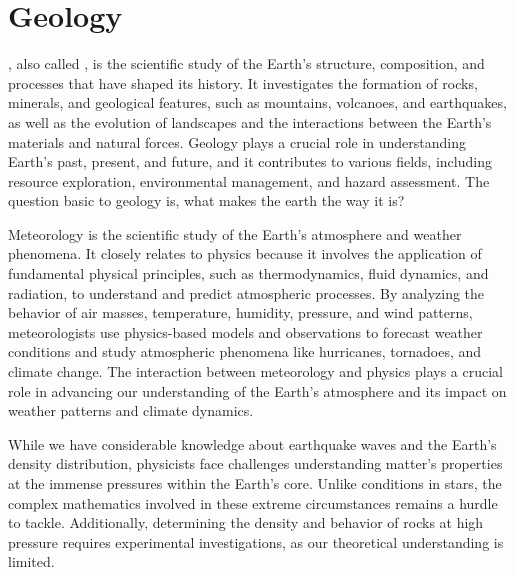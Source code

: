 \section{Geology}

, also called , is the scientific study of the Earth's structure, composition, and processes that have shaped its history. It investigates the formation of rocks, minerals, and geological features, such as mountains, volcanoes, and earthquakes, as well as the evolution of landscapes and the interactions between the Earth's materials and natural forces. Geology plays a crucial role in understanding Earth's past, present, and future, and it contributes to various fields, including resource exploration, environmental management, and hazard assessment. The question basic to geology is, what makes the earth the way it is?

Meteorology is the scientific study of the Earth's atmosphere and weather phenomena. It closely relates to physics because it involves the application of fundamental physical principles, such as thermodynamics, fluid dynamics, and radiation, to understand and predict atmospheric processes. By analyzing the behavior of air masses, temperature, humidity, pressure, and wind patterns, meteorologists use physics-based models and observations to forecast weather conditions and study atmospheric phenomena like hurricanes, tornadoes, and climate change. The interaction between meteorology and physics plays a crucial role in advancing our understanding of the Earth's atmosphere and its impact on weather patterns and climate dynamics.

While we have considerable knowledge about earthquake waves and the Earth's density distribution, physicists face challenges understanding matter's properties at the immense pressures within the Earth's core. Unlike conditions in stars, the complex mathematics involved in these extreme circumstances remains a hurdle to tackle. Additionally, determining the density and behavior of rocks at high pressure requires experimental investigations, as our theoretical understanding is limited.

